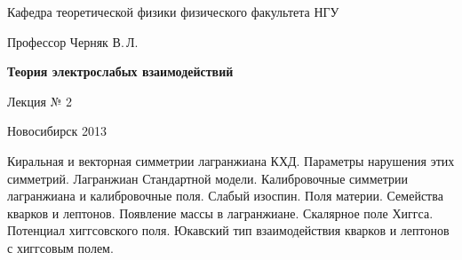 \documentclass[12pt,pagesize,paper=landscape,paper=192mm:108mm]{scrbook}
\begin{document}
\begin{titlepage}
\begin{center}
    Кафедра теоретической физики физического факультета НГУ
    \medskip

    \Large
    Профессор Черняк В.\,Л.
    \bigskip

    \huge
    \textbf{Теория электрослабых взаимодействий}
    \bigskip

    \Large
    Лекция № 2
    \vfill

    \vfill

    \normalsize  Новосибирск 2013
    \smallskip
    
    \ccbysa
  \end{center}
\end{titlepage}

\newpage

\vspace*{-1em}
\begin{center}
 \vfill
  \begin{minipage}{0.66\linewidth}
    Киральная и векторная симметрии лагранжиана КХД. Параметры
    нарушения этих симметрий.  Лагранжиан Стандартной
    модели. Калибровочные симметрии лагранжиана и калибровочные поля.
    Слабый изоспин. Поля материи. Семейства кварков и
    лептонов. Появление массы в лагранжиане.  Скалярное поле
    Хиггса. Потенциал хиггсовского поля. Юкавский тип взаимодействия
    кварков и лептонов с хиггсовым полем.
  \end{minipage}
  \vfill
\end{center}
\end{document}
